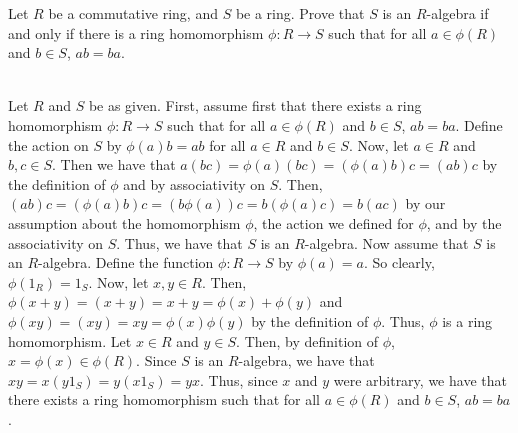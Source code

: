 Let $R$ be a commutative ring, and $S$ be a ring. Prove that $S$ is an $R$-algebra if and only if there
is a ring homomorphism $\phi:R\rightarrow S$ such that for all $a\in\phi(R)$ and $b\in S$, $ab=ba$.

\begin{solution}\renewcommand{\qedsymbol}{}\ \\
    Let $R$ and $S$ be as given. First, assume first that there exists a ring homomorphism
    $\phi:R\rightarrow S$ such that for all $a\in\phi(R)$ and $b\in S$, $ab=ba$. Define the action on
    $S$ by $\phi(a)b=ab$ for all $a\in R$ and $b\in S$. Now, let $a\in R$ and $b,c\in S$. Then we have
    that $a(bc)=\phi(a)(bc)=(\phi(a)b)c=(ab)c$ by the definition of $\phi$ and by associativity on $S$.
    Then, $(ab)c=(\phi(a)b)c=(b\phi(a))c=b(\phi(a)c)=b(ac)$ by our assumption about the homomorphism
    $\phi$, the action we defined for $\phi$, and by the associativity on $S$. Thus, we have that $S$ is
    an $R$-algebra. Now assume that $S$ is an $R$-algebra. Define the function $\phi:R\rightarrow S$ by
    $\phi(a)=a$. So clearly, $\phi(1_R)=1_S$. Now, let $x,y\in R$. Then,
    $\phi(x+y)=(x+y)=x+y=\phi(x)+\phi(y)$ and $\phi(xy)=(xy)=xy=\phi(x)\phi(y)$ by the definition of
    $\phi$. Thus, $\phi$ is a ring homomorphism. Let $x\in R$ and $y\in S$. Then, by definition of
    $\phi$, $x=\phi(x)\in\phi(R)$. Since $S$ is an $R$-algebra, we have that $xy=x(y1_S)=y(x1_S)=yx$.
    Thus, since $x$ and $y$ were arbitrary, we have that there exists a ring homomorphism such that for
    all $a\in\phi(R)$ and $b\in S$, $ab=ba$.

\end{solution}